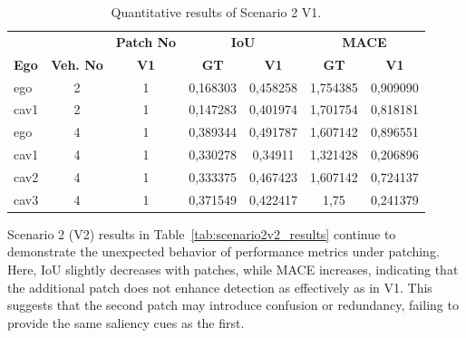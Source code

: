 \begin{table}[H]
    \centering
    \caption{Quantitative results of Scenario 2 V1.}
    \label{tab:scenario2v1_results}
    \begin{adjustbox}{max width=\textwidth}
        \begin{tabularx}{\textwidth}{l c c c c c c}
            \toprule
                &             &   \multicolumn{1}{c}{\textbf{Patch No}}  & \multicolumn{2}{c}{\textbf{IoU}} & \multicolumn{2}{c}{\textbf{MACE}}                            \\
            \cmidrule(lr){4-5}\cmidrule(lr){6-7}
            \textbf{Ego}           &
            \textbf{Veh. No}       &
            \textbf{V1}      &
            \textbf{GT}            & \textbf{V1}  &
            \textbf{GT}            & \textbf{V1}  \\
            \midrule %
            ego         & 2  & 1 & 0,168303 & 0,458258 & 1,754385 & 0,909090 \\
            cav1        & 2  & 1 & 0,147283 & 0,401974 & 1,701754 & 0,818181 \\
            \midrule
            ego         & 4  & 1 & 0,389344 & 0,491787 & 1,607142 & 0,896551 \\
            cav1        & 4  & 1 & 0,330278 & 0,34911 & 1,321428 & 0,206896  \\
            cav2        & 4  & 1 & 0,333375 & 0,467423 & 1,607142 & 0,724137 \\
            cav3        & 4  & 1 & 0,371549 & 0,422417 & 1,75 & 0,241379 \\
            \bottomrule
        \end{tabularx}
    \end{adjustbox}
\end{table}

Scenario 2 (V2) results in Table~\ref{tab:scenario2v2_results} continue to demonstrate the unexpected behavior of performance metrics under patching.
Here, IoU slightly decreases with patches, while MACE increases, indicating that the additional patch does not enhance detection as effectively as in V1.
This suggests that the second patch may introduce confusion or redundancy, failing to provide the same saliency cues as the first.


